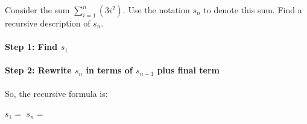 \documentclass[a4paper,12pt]{book}
\newcounter{question}
\begin{document}
        \newpage
        \begin{questionNOGRADE}{\thequestion}

            Consider the sum $\sum_{i=1}^{n} (3i^{2})$. Use the notation
            $s_{n}$ to denote this sum. Find a recursive description of $s_{n}$.

            \paragraph{Step 1: Find $s_{1}$}


            \paragraph{Step 2: Rewrite $s_{n}$ in terms of $s_{n-1}$ plus final term}
            

            So, the recursive formula is:

            \begin{framed}
                $s_{1} = $ 
                \tab[4cm]
                $s_{n} = $ 
            \end{framed}
            
        \end{questionNOGRADE}

        \hrulefill
\end{document}
